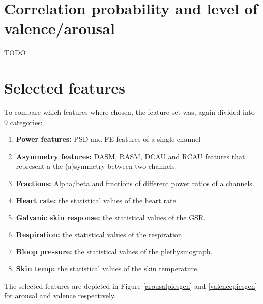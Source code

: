 
\section{Correlation probability and level of valence/arousal}
TODO

\section{Selected features}

To compare which features where chosen, the feature set was, again divided into 9 categories:
\begin{enumerate}
\item \textbf{Power features:} PSD and FE features of a single channel
\item \textbf{Asymmetry features:} DASM, RASM, DCAU and RCAU features that represent a the (a)symmetry between two channels.
\item \textbf{Fractions:} Alpha/beta and fractions of different power ratios of a channels.

\item \textbf{Heart rate:} the statistical values of the heart rate.
\item \textbf{Galvanic skin response:} the statistical values of the GSR.
\item \textbf{Respiration:} the statistical values of the respiration.
\item \textbf{Bloop pressure:} the statistical values of the plethysmograph.
\item \textbf{Skin temp:} the statistical values of the skin temperature.
\end{enumerate} 

The selected features are depicted in Figure \ref{arousalpiesgen} and \ref{valencepiesgen} for arousal and valence respectively.

